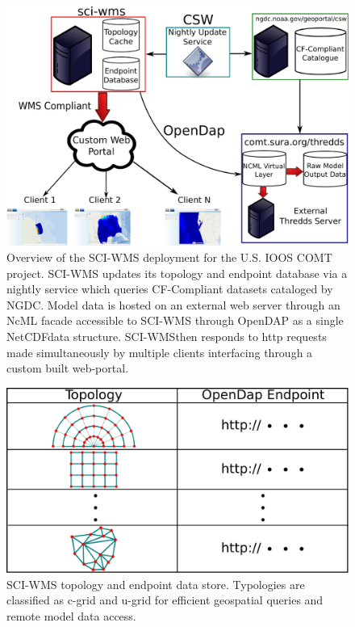 \documentclass[11pt,twocolumn,twoside]{IEEEtran}
\newcommand{\comt}{COMT}
\newcommand{\ioos}{IOOS}
\newcommand{\ugrid}{u-grid}
\newcommand{\cgrid}{c-grid}
\newcommand{\ncml}{NcML}
\newcommand{\ngdc}{NGDC}
\newcommand{\opendap}{OpenDAP}
\newcommand{\netcdf}{NetCDF}
\newcommand{\sciwms}{SCI-WMS}
\newcommand{\Sciwms}{SCI-WMS}
\begin{document}
\begin{figure}
  \centering
  \includegraphics[width=\columnwidth]{./figs/overview.pdf}
  \caption{Overview of the \sciwms{} deployment for the U.S. \ioos{}
    \comt{} project. \Sciwms{} updates its topology and endpoint
    database via a nightly service which queries CF-Compliant datasets
    cataloged by \ngdc{}. Model data is hosted on an external web
    server through an \ncml{} facade accessible to \sciwms{} through
    \opendap{} as a single \netcdf data structure. \Sciwms then
    responds to http requests made simultaneously by multiple clients
    interfacing through a custom built web-portal.}
  \label{fig:overview1}
\end{figure}

\begin{figure}
  \centering
  \includegraphics[width=0.8\columnwidth]{./figs/sciwms_db_topology_endpoints.pdf}
  \caption{\Sciwms{} topology and endpoint data store. Typologies are
    classified as \cgrid{} and \ugrid{} for efficient geospatial
    queries and remote model data access.}
  \label{fig:sciwms_topology_endpoints}
\end{figure}
\end{document}

